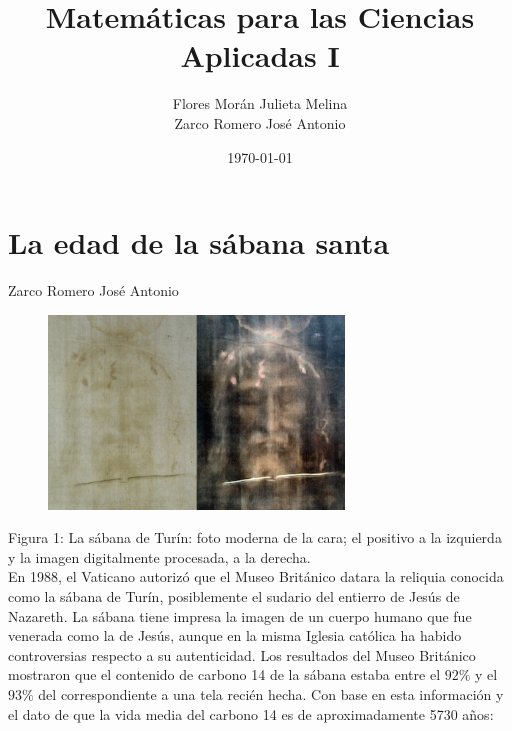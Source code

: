 \documentclass[12pt]{article}
\title{Matemáticas para las Ciencias Aplicadas I}
\date{\today}
\author{Flores Morán Julieta Melina \\ Zarco Romero José Antonio}
\begin{document}
\maketitle

\section{La edad de la sábana santa}
Zarco Romero José Antonio\\

\begin{figure}[h]
\centering
\includegraphics[width=0.7\textwidth]{img/sabanaSanta.png}
\end{figure}
Figura 1: La sábana de Turín: foto moderna de la cara; el positivo a la izquierda y la imagen digitalmente procesada, a la derecha.\\

En 1988, el Vaticano autorizó que el Museo Británico datara la reliquia conocida como la sábana de Turín, posiblemente el sudario del entierro de Jesús de Nazareth. La sábana tiene impresa la imagen de un cuerpo humano que fue venerada como la de Jesús, aunque en la misma Iglesia católica ha habido controversias respecto a su autenticidad. Los resultados del Museo Británico mostraron que el contenido de carbono 14 de la sábana estaba entre el $92 \%$ y el $93 \%$ del correspondiente a una tela recién hecha. Con base en esta información y el dato de que la vida media del carbono 14 es de aproximadamente 5730 años:
\end{document}
